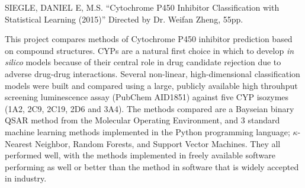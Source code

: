SIEGLE, DANIEL E, M.S.
``Cytochrome P450 Inhibitor Classification with Statistical Learning (2015)'' Directed by Dr. Weifan Zheng, 55pp.
\vspace{1cm}


This project compares methods of Cytochrome P450 inhibitor prediction based on compound structures. CYPs are a natural first choice in which to  develop \textit{in silico} models because of their central role in drug candidate rejection due to adverse drug-drug interactions. Several non-linear, high-dimensional classification models were built and compared using a large, publicly available high throuhput screening luminescence assay (PubChem AID1851) against five CYP isozymes (1A2, 2C9, 2C19, 2D6 and 3A4). The methods compared are a Bayseian binary QSAR method from the Molecular Operating Environment, and 3 standard machine learning methods implemented in the Python programming language; $\kappa$-Nearest Neighbor, Random Forests, and Support Vector Machines. They all performed well, with the methods implemented in freely available software performing as well or better than the method in software that is widely accepted in industry. 